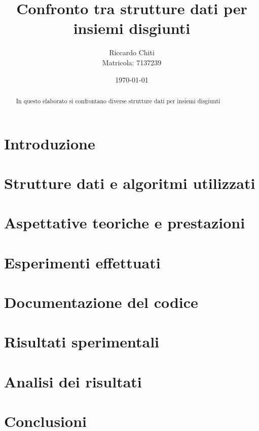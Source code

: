 \documentclass[a4paper,12pt]{article}
\title{Confronto tra strutture dati per insiemi disgiunti}
\author{Riccardo Chiti \\ Matricola: 7137239}
\date{\today}
\begin{document}
\maketitle

\begin{abstract}
In questo elaborato si confrontano diverse strutture dati per insiemi disgiunti
    
\end{abstract}

\section{Introduzione}

\section{Strutture dati e algoritmi utilizzati}

\section{Aspettative teoriche e prestazioni}

\section{Esperimenti effettuati}

\section{Documentazione del codice}

\section{Risultati sperimentali}

\section{Analisi dei risultati}

\section{Conclusioni}
 
\end{document}

